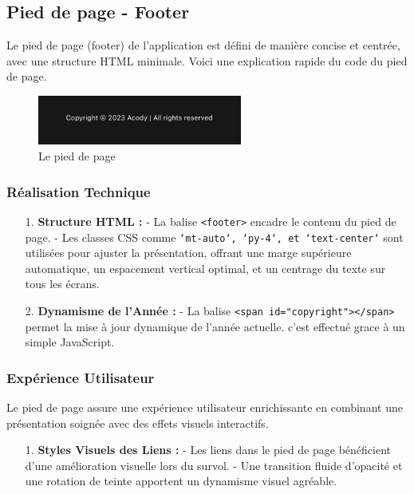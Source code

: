 \documentclass[12pt, a4paper, oneside]{article}
\begin{document}
\newpage
\subsection{Pied de page - Footer}
Le pied de page (footer) de l'application est défini de manière concise et centrée, 
avec une structure HTML minimale. Voici une explication rapide du code du pied de page.

\begin{figure}[h]
  \centering
  \includegraphics[width=0.6\textwidth]{images/PiedDePage.png}
  \caption{Le pied de page}
\end{figure}

\subsubsection{Réalisation Technique}
\begin{enumerate}
  \item[1.] \textbf{Structure HTML :}
  \newline- La balise \texttt{<footer>} encadre le contenu du pied de page.\newline
  - Les classes CSS comme \texttt{`mt-auto`, `py-4`, et `text-center`} sont utilisées pour ajuster la présentation, offrant une marge supérieure automatique, un espacement vertical optimal, et un centrage du texte sur tous les écrans.


  \item[2.] \textbf{Dynamisme de l'Année :}
  \newline
  - La balise \texttt{<span id="copyright"></span>} permet la mise à jour dynamique de l'année actuelle. c'est effectué grace à un simple JavaScript.
\end{enumerate}

\subsubsection{Expérience Utilisateur}
Le pied de page assure une expérience utilisateur enrichissante en combinant une présentation soignée avec des effets visuels interactifs.

\begin{enumerate}
  \item[1.] \textbf{Styles Visuels des Liens :}
  \newline - Les liens dans le pied de page bénéficient d'une amélioration visuelle lors du survol.\newline
  - Une transition fluide d'opacité et une rotation de teinte apportent un dynamisme visuel agréable.
\end{enumerate}
\end{document}
